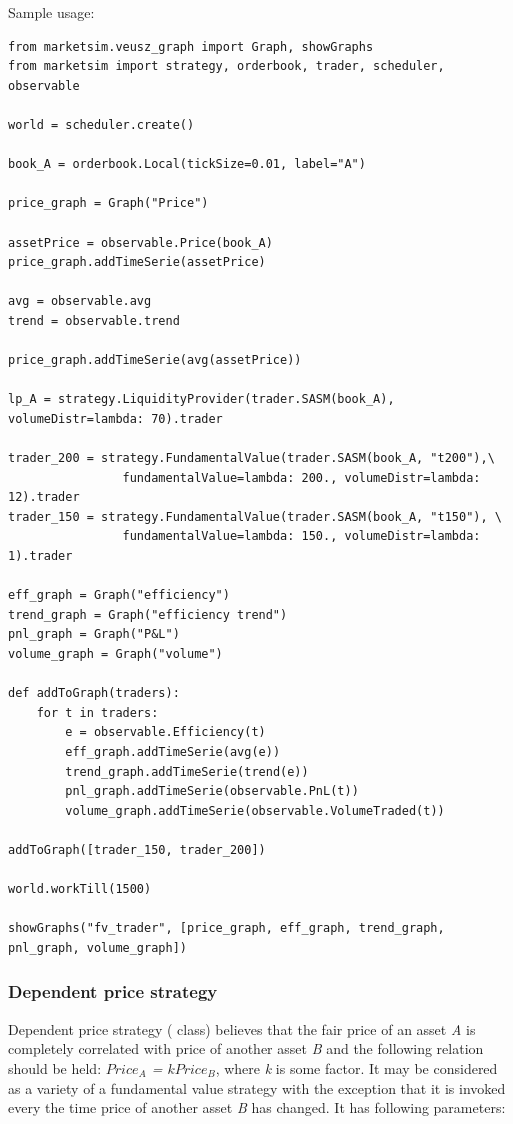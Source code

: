 \documentclass[a4paper,11pt]{article}
\newcommand{\tmtexttt}[1]{{\ttfamily{#1}}}
\begin{document}
Sample usage:

\begin{verbatim}
from marketsim.veusz_graph import Graph, showGraphs
from marketsim import strategy, orderbook, trader, scheduler, observable

world = scheduler.create()

book_A = orderbook.Local(tickSize=0.01, label="A")

price_graph = Graph("Price")
 
assetPrice = observable.Price(book_A)
price_graph.addTimeSerie(assetPrice)

avg = observable.avg
trend = observable.trend

price_graph.addTimeSerie(avg(assetPrice))

lp_A = strategy.LiquidityProvider(trader.SASM(book_A), volumeDistr=lambda: 70).trader

trader_200 = strategy.FundamentalValue(trader.SASM(book_A, "t200"),\
                fundamentalValue=lambda: 200., volumeDistr=lambda: 12).trader
trader_150 = strategy.FundamentalValue(trader.SASM(book_A, "t150"), \
                fundamentalValue=lambda: 150., volumeDistr=lambda: 1).trader

eff_graph = Graph("efficiency")
trend_graph = Graph("efficiency trend")
pnl_graph = Graph("P&L")
volume_graph = Graph("volume")

def addToGraph(traders):
    for t in traders:
        e = observable.Efficiency(t)
        eff_graph.addTimeSerie(avg(e))
        trend_graph.addTimeSerie(trend(e))
        pnl_graph.addTimeSerie(observable.PnL(t))
        volume_graph.addTimeSerie(observable.VolumeTraded(t))

addToGraph([trader_150, trader_200])

world.workTill(1500)

showGraphs("fv_trader", [price_graph, eff_graph, trend_graph, pnl_graph, volume_graph])
\end{verbatim}

\subsubsection{Dependent price strategy}

Dependent price strategy (\tmtexttt{strategy.Dependency} class) believes that the fair price of an asset \textit{A} is completely correlated with price of another asset \textit{B} and the following relation should be held: \textit{$Price_{A}$ = $kPrice_B$}, where \textit{k} is some factor. It may be considered as a variety of a fundamental value strategy with the exception that it is invoked every the time price of another asset \textit{B} has changed. It has following parameters: 
\end{document}
